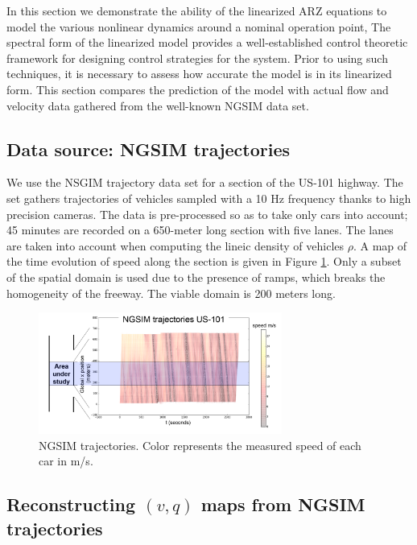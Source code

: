 \documentclass[5p,twocolumn]{elsarticle}
\begin{document}
In this section we demonstrate the ability of the linearized ARZ equations to model the various nonlinear dynamics around a nominal operation point, The spectral form of the linearized
model provides a well-established control theoretic framework for designing control strategies for the system. Prior to using such techniques, it is necessary to assess how accurate the
model is in its linearized form. This section compares the prediction of the model with actual flow
and velocity data gathered from the well-known NGSIM data set.


\subsection{Data source: NGSIM trajectories}

We use the NSGIM trajectory data set for a section of the US-101 highway. The set gathers trajectories of vehicles sampled with a 10 Hz frequency thanks to high precision cameras. The data is pre-processed so as to take only cars into account; 45 minutes are recorded on a 650-meter long section with five lanes. The lanes are taken into account when computing the lineic density of vehicles $\rho$.
A map of the time evolution of speed along the section is given in Figure \ref{fig:NGSIM-trajectories}.
Only a subset of the spatial domain is used due to the presence of ramps, which breaks the homogeneity of the freeway. The viable domain is 200 meters long.

\begin{figure}
\centering
\includegraphics[width=8cm]{US-101_all_traj_low_res_mod}
\protect\caption{NGSIM trajectories. Color represents the measured speed of each
car in m/s.}
\label{fig:NGSIM-trajectories}
\end{figure}



\subsection{Reconstructing $(v,q)$ maps from NGSIM trajectories}
\end{document}
